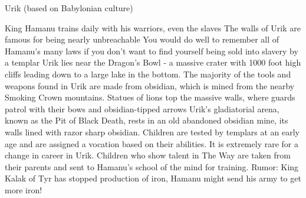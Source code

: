 Urik (based on Babylonian culture)

    King Hamanu trains daily with his warriors, even the slaves
    The walls of Urik are famous for being nearly unbreachable
    You would do well to remember all of Hamanu’s many laws if you don’t want to find yourself being sold into slavery by a templar
    Urik lies near the Dragon’s Bowl - a massive crater with 1000 foot high cliffs leading down to a large lake in the bottom.
    The majority of the tools and weapons found in Urik are made from obsidian, which is mined from the nearby Smoking Crown mountains.
    Statues of lions top the massive walls, where guards patrol with their bows and obsidian-tipped arrows
    Urik’s gladiatorial arena, known as the Pit of Black Death, rests in an old abandoned obsidian mine, its walls lined with razor sharp obsidian.
    Children are tested by templars at an early age and are assigned a vocation based on their abilities. It is extremely rare for a change in career in Urik.
    Children who show talent in The Way are taken from their parents and sent to Hamanu’s school of the mind for training.
    Rumor: King Kalak of Tyr has stopped production of iron, Hamanu might send his army to get more iron!


